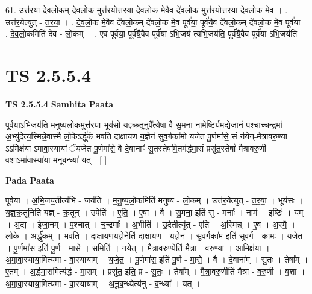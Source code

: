 \documentclass[17pt]{extarticle}
\begin{document}
61. उत्त॑रया देवलो॒कम् दे॑वलो॒क मुत्त॑र॒योत्त॑रया देवलो॒क मे॒वैव दे॑वलो॒क मुत्त॑र॒योत्त॑रया देवलो॒क मे॒व । . उत्त॑र॒येत्युत् - त॒र॒या॒ । . दे॒व॒लो॒क मे॒वैव दे॑वलो॒कम् दे॑वलो॒क मे॒व पूर्व॑या॒ पूर्व॑यै॒व दे॑वलो॒कम् दे॑वलो॒क मे॒व पूर्व॑या । . दे॒व॒लो॒कमिति॑ देव - लो॒कम् । . ए॒व पूर्व॑या॒ पूर्व॑यै॒वैव पूर्व॑या ऽभि॒जय॑ त्यभि॒जय॑ति॒ पूर्व॑यै॒वैव पूर्व॑या ऽभि॒जय॑ति । \newline
\pagebreak
{}

\section{ TS 2.5.5.4 }

\textbf{TS 2.5.5.4 } \newline
\textbf{Samhita Paata} \newline

पूर्व॑याऽभि॒जय॑ति मनुष्यलो॒कमुत्त॑रया॒ भूय॑सो यज्ञ्क्र॒तूनुपै᳚त्ये॒षा वै सु॒मना॒ नामेष्टि॒र्यम॒द्येजा॒नं प॒श्चाच्च॒न्द्रमा॑ अ॒भ्यु॑देत्य॒स्मिन्ने॒वास्मै॑ लो॒केऽर्द्धु॑कं भवति दाक्षायण य॒ज्ञेन॑ सुव॒र्गका॑मो यजेत पू॒र्णमा॑से॒ सं न॑येन्-मैत्रावरु॒ण्या ऽऽमिक्ष॑या ऽमावा॒स्या॑यां ॅयजेत पू॒र्णमा॑से॒ वै दे॒वानाꣳ॑ सु॒तस्तेषा॑मे॒तम॑र्द्धमा॒सं प्रसु॑त॒स्तेषां᳚ मैत्रावरु॒णी व॒शाऽमा॑वा॒स्या॑या-मनूब॒न्ध्या॑ यत् - [  ] \newline

\textbf{Pada Paata} \newline

पूर्व॑या । अ॒भि॒जय॒तीत्य॑भि - जय॑ति । म॒नु॒ष्य॒लो॒कमिति॑ मनुष्य - लो॒कम् । उत्त॑र॒येत्युत् - त॒र॒या॒ । भूय॑सः । य॒ज्ञ्॒क्र॒तूनिति॑ यज्ञ् - क्र॒तून् । उपेति॑ । ए॒ति॒ । ए॒षा । वै । सु॒मना॒ इति॑ सु - मनाः᳚ । नाम॑ । इष्टिः॑ । यम् । अ॒द्य । ई॒जा॒नम् । प॒श्चात् । च॒न्द्रमाः᳚ । अ॒भीति॑ । उ॒देतीत्यु॑त् - एति॑ । अ॒स्मिन्न् । ए॒व । अ॒स्मै॒ । लो॒के । अर्द्धु॑कम् । भ॒व॒ति॒ । दा॒क्षा॒य॒ण॒य॒ज्ञेनेति॑ दाक्षायण - य॒ज्ञेन॑ । सु॒व॒र्गका॑म॒ इति॑ सुव॒र्ग - का॒मः॒ । य॒जे॒त॒ । पू॒र्णमा॑स॒ इति॑ पू॒र्ण - मा॒से॒ । समिति॑ । न॒ये॒त् । मै॒त्रा॒व॒रु॒ण्येति॑ मैत्रा - व॒रु॒ण्या । आ॒मिक्ष॑या । अ॒मा॒वा॒स्या॑या॒मित्य॑मा - वा॒स्या॑याम् । य॒जे॒त॒ । पू॒र्णमा॑स॒ इति॑ पू॒र्ण - मा॒से॒ । वै । दे॒वाना᳚म् । सु॒तः । तेषा᳚म् । ए॒तम् । अ॒र्द्ध॒मा॒समित्य॑र्द्ध - मा॒सम् । प्रसु॑त॒ इति॒ प्र - सु॒तः॒ । तेषा᳚म् । मै॒त्रा॒वरु॒णीति॑ मैत्रा - व॒रु॒णी । व॒शा । अ॒मा॒वा॒स्या॑या॒मित्य॑मा - वा॒स्या॑याम् । अ॒नू॒ब॒न्ध्येत्य॑नु - ब॒न्ध्या᳚ । यत् ।  \newline
\end{document}
